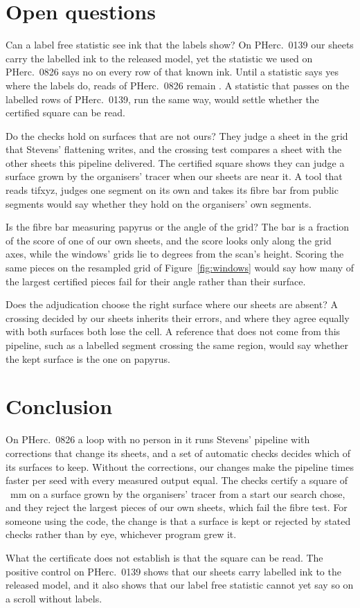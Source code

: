 \section{Open questions}

Can a label free statistic see ink that the labels show? On PHerc.~0139 our sheets carry the labelled ink to the
released model, yet the statistic we used on PHerc.~0826 says no on every row of that known ink. Until a statistic says
yes where the labels do, reads of PHerc.~0826 remain \PcInkReading{}. A statistic that passes on the labelled rows of
PHerc.~0139, run the same way, would settle whether the certified square can be read.

Do the checks hold on surfaces that are not ours? They judge a sheet in the grid that Stevens' flattening writes, and
the crossing test compares a sheet with the other sheets this pipeline delivered. The certified square shows they can
judge a surface grown by the organisers' tracer when our sheets are near it. A tool that reads tifxyz, judges one
segment on its own and takes its fibre bar from public segments would say whether they hold on the organisers' own
segments.

Is the fibre bar measuring papyrus or the angle of the grid? The bar is a fraction of the score of one of our own
sheets, and the score looks only along the grid axes, while the windows' grids lie \WinAngleMin{} to \WinAngleMax{}
degrees from the scan's height. Scoring the same pieces on the resampled grid of Figure~\ref{fig:windows} would say how
many of the \FibreTopFailCount{} largest certified pieces fail for their angle rather than their surface.

Does the adjudication choose the right surface where our sheets are absent? A crossing decided by our sheets inherits
their errors, and where they agree equally with both surfaces both lose the cell. A reference that does not come from
this pipeline, such as a labelled segment crossing the same region, would say whether the kept surface is the one on
papyrus.

\section{Conclusion}

On PHerc.~0826 a loop with no person in it runs Stevens' pipeline with corrections that change its sheets, and a set of
automatic checks decides which of its surfaces to keep. Without the corrections, our changes make the pipeline
\ArmFactorAC{} times faster per seed with every measured output equal. The checks certify a square of
\RcOneSquare{}~mm on a surface grown by the organisers' tracer from a start our search chose, and they reject the
largest pieces of our own sheets, which fail the fibre test. For someone using the code, the change is that a surface
is kept or rejected by stated checks rather than by eye, whichever program grew it.

What the certificate does not establish is that the square can be read. The positive control on PHerc.~0139 shows that
our sheets carry labelled ink to the released model, and it also shows that our label free statistic cannot yet say so
on a scroll without labels.
